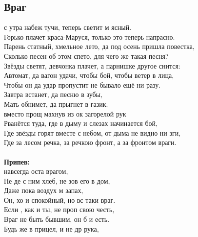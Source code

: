 \documentclass[fleqn,a5paper,12pt,twoside]{guitartabs}
\begin{document}
\subsection*{Враг}
     с утра набеж тучи,  теперь светит м ясный.\\
    Горько плачет краса-Маруся, только это теперь напрасно.\\
    Парень статный, хмельное лето, да под осень пришла повестка,\\
    Сколько песен об этом спето, для чего же такая песня?       \\                            
    Звёзды светят, девчонка плачет, а парнишке другое снится:\\
    Автомат, да вагон удачи, чтобы бой, чтобы ветер в лица,\\
    Чтобы он да удар пропустит не бывало ещё ни разу.\\
    Завтра встанет, да песню в зубы, \\
    Мать обнимет, да прыгнет в газик.\\
     вместо прощ махнув из ок загорелой рук\\
    Рванётся туда, где в дыму и слезах начинается бой,\\
    Где звёзды горят вместе с небом, от дыма не видно ни зги,\\
    Где за лесом речка, за речкою фронт, а за фронтом враги.\\
    \\
    \-\hspace{10mm}\textbf{Припев:}\\
    \-\hspace{10mm} навсегда оста врагом,\\
    \-\hspace{10mm}Не де с ним хлеб, не зов его в дом,\\
    \-\hspace{10mm}Даже  пока воздух м запах,\\
    \-\hspace{10mm}Он, хо и спокойный, но вс-таки враг.\\
    \-\hspace{10mm}Если , как и ты, не проп свою честь,\\
    \-\hspace{10mm}Враг не  быть бывшим, он б и есть.\\
    \-\hspace{10mm}Будь же в прицел, и не др рука,\\
\end{document}
